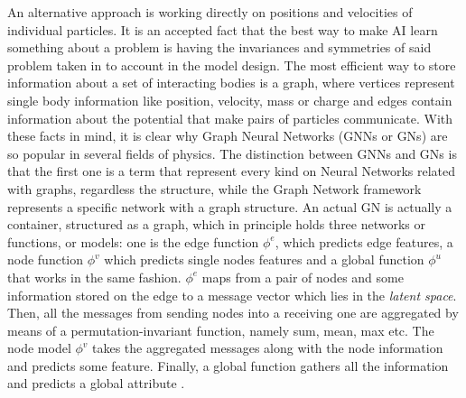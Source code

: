 \documentclass[../../master_thesis_np.tex]{subfiles}
\begin{document}
	An alternative approach is working directly on positions and velocities of individual particles. 
	It is an accepted fact that the best way to make AI learn something about a problem is having the invariances and symmetries of said problem taken in to account in the model design. 
	The most efficient way to store information about a set of interacting bodies is a graph, where vertices represent single body information like position, velocity, mass or charge and edges contain information about the potential that make pairs of particles communicate. 
	With these facts in mind, it is clear why Graph Neural Networks (GNNs or GNs) are so popular in several fields of physics. 
	The distinction between GNNs and GNs is that the first one is a term that represent every kind on Neural Networks related with graphs, regardless the structure, while the Graph Network framework represents a specific network with a graph structure. 
	An actual GN is actually a container, structured as a graph, which in principle holds three networks or functions, or models: one is the edge function $\phi^e$, which predicts edge features, a node function $\phi^v$ which predicts single nodes features and a global function $\phi^u$ that works in the same fashion. 
	$\phi^e$ maps from a pair of nodes and some information stored on the edge to a message vector which lies in the \emph{latent space}. 
	Then, all the messages from sending nodes into a receiving one are aggregated by means of a permutation-invariant function, namely sum, mean, max etc. 
	The node model $\phi^v$ takes the aggregated messages along with the node information and predicts some feature. 
	Finally, a global function gathers all the information and predicts a global attribute \cite{battaglia_relational_2018}.
	
\end{document}
